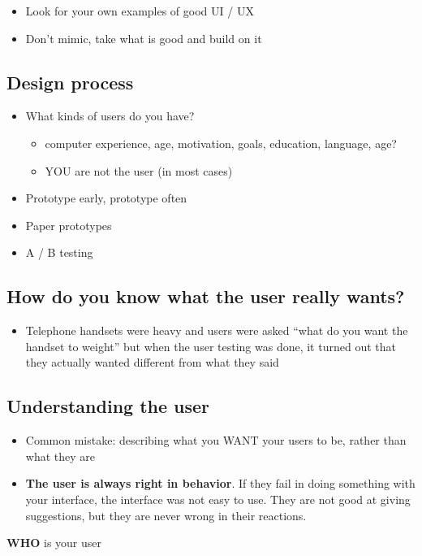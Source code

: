 \begin{itemize}
\item
  Look for your own examples of good UI / UX
\item
  Don't mimic, take what is good and build on it
\end{itemize}
\subsection{Design process}

\begin{itemize}
\item
  What kinds of users do you have?
  \begin{itemize}
  \item
    computer experience, age, motivation, goals, education, language,
    age?
  \item
    YOU are not the user (in most cases)
  \end{itemize}
\item
  Prototype early, prototype often
\item
  Paper prototypes
\item
  A / B testing
\end{itemize}
\subsection{How do you know what the user really wants?}

\begin{itemize}
\item
  Telephone handsets were heavy and users were asked ``what do you want
  the handset to weight'' but when the user testing was done, it turned
  out that they actually wanted different from what they said
\end{itemize}
\subsection{Understanding the user}

\begin{itemize}
\item
  Common mistake: describing what you WANT your users to be, rather than
  what they are
\item
  \textbf{The user is always right in behavior}. If they fail in doing
  something with your interface, the interface was not easy to use. They
  are not good at giving suggestions, but they are never wrong in their
  reactions.
\end{itemize}
\textbf{WHO} is your user

